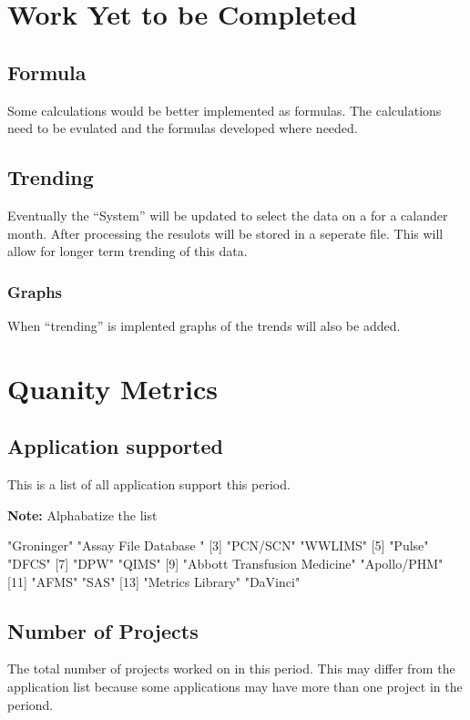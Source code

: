 \documentclass{article}
\begin{document}
\section{Work Yet to be Completed}
\subsection{Formula}
Some calculations would be better implemented as formulas. The calculations need
to be evulated and the formulas developed where needed.
\subsection{Trending}
Eventually the ``System'' will be updated to select the data on a for a calander
month. After processing the resulots will be stored in a seperate file.
This will allow for longer term trending of this data.
\subsubsection{Graphs}
When ``trending'' is implented graphs of the trends will also be added.


\section{Quanity Metrics}
\subsection{Application supported}
This is a list of all application support this period.

\textbf{Note:} Alphabatize the list

\begin{Schunk}
\begin{Soutput}
 [1] "Groninger"                   "Assay File Database "       
 [3] "PCN/SCN"                     "WWLIMS"                     
 [5] "Pulse"                       "DFCS"                       
 [7] "DPW"                         "QIMS"                       
 [9] "Abbott Transfusion Medicine" "Apollo/PHM"                 
[11] "AFMS"                        "SAS"                        
[13] "Metrics Library"             "DaVinci"                    
\end{Soutput}
\end{Schunk}

\subsection{Number of Projects}
The total number of  projects worked on in this period. This may differ from the
application list because some applications may have more than one project in
the periond.
\end{document}
